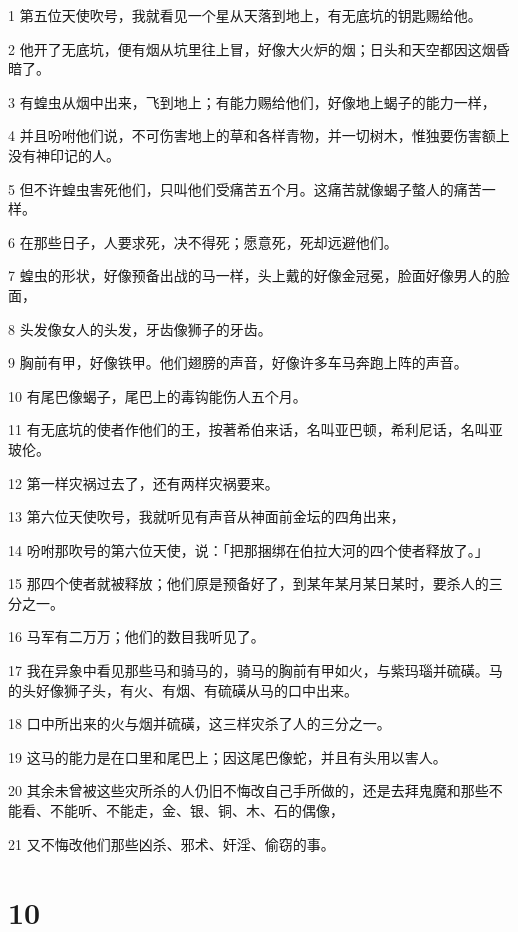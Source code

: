 \par 1 第五位天使吹号，我就看见一个星从天落到地上，有无底坑的钥匙赐给他。
\par 2 他开了无底坑，便有烟从坑里往上冒，好像大火炉的烟；日头和天空都因这烟昏暗了。
\par 3 有蝗虫从烟中出来，飞到地上；有能力赐给他们，好像地上蝎子的能力一样，
\par 4 并且吩咐他们说，不可伤害地上的草和各样青物，并一切树木，惟独要伤害额上没有神印记的人。
\par 5 但不许蝗虫害死他们，只叫他们受痛苦五个月。这痛苦就像蝎子螫人的痛苦一样。
\par 6 在那些日子，人要求死，决不得死；愿意死，死却远避他们。
\par 7 蝗虫的形状，好像预备出战的马一样，头上戴的好像金冠冕，脸面好像男人的脸面，
\par 8 头发像女人的头发，牙齿像狮子的牙齿。
\par 9 胸前有甲，好像铁甲。他们翅膀的声音，好像许多车马奔跑上阵的声音。
\par 10 有尾巴像蝎子，尾巴上的毒钩能伤人五个月。
\par 11 有无底坑的使者作他们的王，按著希伯来话，名叫亚巴顿，希利尼话，名叫亚玻伦。
\par 12 第一样灾祸过去了，还有两样灾祸要来。
\par 13 第六位天使吹号，我就听见有声音从神面前金坛的四角出来，
\par 14 吩咐那吹号的第六位天使，说：「把那捆绑在伯拉大河的四个使者释放了。」
\par 15 那四个使者就被释放；他们原是预备好了，到某年某月某日某时，要杀人的三分之一。
\par 16 马军有二万万；他们的数目我听见了。
\par 17 我在异象中看见那些马和骑马的，骑马的胸前有甲如火，与紫玛瑙并硫磺。马的头好像狮子头，有火、有烟、有硫磺从马的口中出来。
\par 18 口中所出来的火与烟并硫磺，这三样灾杀了人的三分之一。
\par 19 这马的能力是在口里和尾巴上；因这尾巴像蛇，并且有头用以害人。
\par 20 其余未曾被这些灾所杀的人仍旧不悔改自己手所做的，还是去拜鬼魔和那些不能看、不能听、不能走，金、银、铜、木、石的偶像，
\par 21 又不悔改他们那些凶杀、邪术、奸淫、偷窃的事。

\chapter{10}

